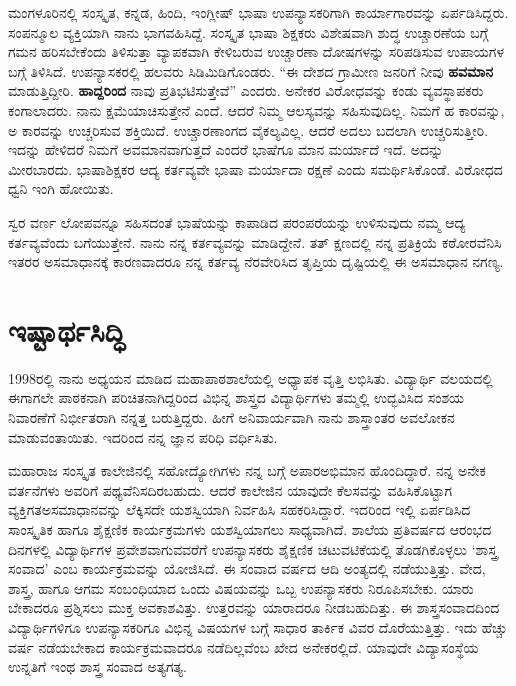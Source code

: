 {ಮಂಗಳೂರಿನಲ್ಲಿ ಸಂಸ್ಕೃತ, ಕನ್ನಡ, ಹಿಂದಿ, ಇಂಗ್ಲೀಷ್ ಭಾಷಾ ಉಪನ್ಯಾಸಕರಿಗಾಗಿ ಕಾರ್ಯಾಗಾರವನ್ನು ಏರ್ಪಡಿಸಿದ್ದರು.  ಸಂಪನ್ಮೂಲ ವ್ಯಕ್ತಿಯಾಗಿ ನಾನು ಭಾಗವಹಿಸಿದ್ದೆ.  ಸಂಸ್ಕೃತ ಭಾಷಾ ಶಿಕ್ಷಕರು ವಿಶೇಷವಾಗಿ ಶುದ್ಧ ಉಚ್ಚಾರಣೆಯ ಬಗ್ಗೆ ಗಮನ ಹರಿಸ\-ಬೇಕೆಂದು ತಿಳಿಸುತ್ತಾ ವ್ಯಾಪಕವಾಗಿ ಕೇಳಿಬರುವ ಉಚ್ಚಾರಣಾ ದೋಷಗಳನ್ನು ಸರಿಪಡಿಸುವ ಉಪಾಯಗಳ ಬಗ್ಗೆ ತಿಳಿಸಿದೆ.  ಉಪನ್ಯಾಸಕರಲ್ಲಿ ಹಲವರು ಸಿಡಿಮಿಡಿಗೊಂಡರು.  “ಈ ದೇಶದ ಗ್ರಾಮೀಣ ಜನರಿಗೆ ನೀವು \textbf{ಹವಮಾನ} ಮಾಡುತ್ತಿದ್ದೀರಿ.  \textbf{ಹಾದ್ದರಿಂದ} ನಾವು ಪ್ರತಿಭಟಿಸುತ್ತೇವೆ” ಎಂದರು.  ಅನೇಕರ ವಿರೋಧವನ್ನು ಕಂಡು ವ್ಯವಸ್ಥಾಪಕರು ಕಂಗಾಲಾದರು. ನಾನು ಕ್ಷಮೆಯಾಚಿಸುತ್ತೇನೆ  ಎಂದೆ.   ಆದರೆ ನಿಮ್ಮ ಆಲಸ್ಯವನ್ನು ಸಹಿಸು\-ವುದಿಲ್ಲ.  ನಿಮಗೆ ಹ ಕಾರವನ್ನು, ಅ ಕಾರವನ್ನು ಉಚ್ಚರಿಸುವ ಶಕ್ತಿಯಿದೆ.  ಉಚ್ಚಾರಣಾಂಗದ ವೈಕಲ್ಯವಿಲ್ಲ.  ಆದರೆ ಅದಲು ಬದಲಾಗಿ ಉಚ್ಚರಿಸುತ್ತೀರಿ.  ಇದನ್ನು ಹೇಳಿದರೆ ನಿಮಗೆ ಅವಮಾನವಾಗುತ್ತದೆ ಎಂದರೆ ಭಾಷೆಗೂ ಮಾನ  \enginline{-}  ಮರ್ಯಾದೆ ಇದೆ.  ಅದನ್ನು ಮೀರಬಾರದು.  ಭಾಷಾಶಿಕ್ಷಕರ ಆದ್ಯ ಕರ್ತವ್ಯವೇ ಭಾಷಾ ಮರ್ಯಾದಾ ರಕ್ಷಣೆ ಎಂದು ಸಮರ್ಥಿಸಿಕೊಂಡೆ.  ವಿರೋಧದ ಧ್ವನಿ ಇಂಗಿ ಹೋಯಿತು. 

ಸ್ವರ ವರ್ಣ ಲೋಪವನ್ನೂ ಸಹಿಸದಂತೆ ಭಾಷೆಯನ್ನು ಕಾಪಾಡಿದ ಪರಂಪರೆಯನ್ನು ಉಳಿಸುವುದು ನಮ್ಮ ಆದ್ಯ ಕರ್ತವ್ಯವೆಂದು ಬಗೆಯುತ್ತೇನೆ.  ನಾನು ನನ್ನ ಕರ್ತವ್ಯವನ್ನು ಮಾಡಿದ್ದೇನೆ.  ತತ್ ಕ್ಷಣದಲ್ಲಿ ನನ್ನ ಪ್ರತಿಕ್ರಿಯೆ ಕಠೋರವೆನಿಸಿ ಇತರರ ಅಸಮಾಧಾನಕ್ಕೆ ಕಾರಣವಾದರೂ ನನ್ನ ಕರ್ತವ್ಯ ನೆರವೇರಿಸಿದ ತೃಪ್ತಿಯ ದೃಷ್ಟಿಯಲ್ಲಿ ಈ ಅಸಮಾಧಾನ ನಗಣ್ಯ.

\section*{ಇಷ್ಟಾರ್ಥಸಿದ್ಧಿ }

1998ರಲ್ಲಿ ನಾನು ಅಧ್ಯಯನ ಮಾಡಿದ ಮಹಾಪಾಠಶಾಲೆಯಲ್ಲಿ ಅಧ್ಯಾಪಕ ವೃತ್ತಿ ಲಭಿಸಿತು.  ವಿದ್ಯಾರ್ಥಿ ವಲಯದಲ್ಲಿ ಈಗಾಗಲೇ ಪಾಠಕನಾಗಿ ಪರಿಚಿತನಾಗಿದ್ದರಿಂದ ವಿಭಿನ್ನ ಶಾಸ್ತ್ರದ ವಿದ್ಯಾರ್ಥಿಗಳು ತಮ್ಮಲ್ಲಿ ಉದ್ಭವಿಸಿದ ಸಂಶಯ ನಿವಾರಣೆಗೆ ನಿರ್ಭೀತರಾಗಿ ನನ್ನತ್ತ ಬರುತ್ತಿದ್ದರು.  ಹೀಗೆ ಅನಿವಾರ್ಯವಾಗಿ ನಾನು ಶಾಸ್ತ್ರಾಂತರ ಅವಲೋಕನ ಮಾಡುವಂತಾಯಿತು.  ಇದರಿಂದ ನನ್ನ ಜ್ಞಾನ ಪರಿಧಿ ವರ್ಧಿಸಿತು.  

ಮಹಾರಾಜ ಸಂಸ್ಕೃತ ಕಾಲೇಜಿನಲ್ಲಿ ಸಹೋದ್ಯೋಗಿಗಳು ನನ್ನ ಬಗ್ಗೆ ಅಪಾರ\break ಅಭಿಮಾನ ಹೊಂದಿದ್ದಾರೆ.  ನನ್ನ ಅನೇಕ ವರ್ತನೆಗಳು ಅವರಿಗೆ ಪಥ್ಯವೆನಿಸದಿರಬಹುದು.   ಆದರೆ ಕಾಲೇಜಿನ ಯಾವುದೇ ಕೆಲಸವನ್ನು ವಹಿಸಿಕೊಟ್ಟಾಗ ವ್ಯಕ್ತಿಗತ\break ಅಸಮಾಧಾನವನ್ನು ಲೆಕ್ಕಿಸದೇ ಯಶಸ್ವಿಯಾಗಿ ನಿರ್ವಹಿಸಿ ಸಹಕರಿಸಿದ್ದಾರೆ.  ಇದರಿಂದ ಇಲ್ಲಿ ಏರ್ಪಡಿ\-ಸಿದ ಸಾಂಸ್ಕೃತಿಕ ಹಾಗೂ ಶೈಕ್ಷಣಿಕ ಕಾರ್ಯಕ್ರಮಗಳು ಯಶಸ್ವಿಯಾಗಲು ಸಾಧ್ಯವಾಗಿದೆ.  ಶಾಲೆಯ ಪ್ರತಿವರ್ಷದ ಆರಂಭದ ದಿನಗಳಲ್ಲಿ ವಿದ್ಯಾರ್ಥಿಗಳ ಪ್ರವೇಶವಾಗುವವರೆಗೆ ಉಪನ್ಯಾಸಕರು ಶೈಕ್ಷಣಿಕ ಚಟುವಟಿಕೆಯಲ್ಲಿ ತೊಡಗಿಕೊಳ್ಳಲು ‘ಶಾಸ್ತ್ರ ಸಂವಾದ’ ಎಂಬ ಕಾರ್ಯಕ್ರಮವನ್ನು ಯೋಜಿಸಿದೆ.  ಈ ಸಂವಾದ ವರ್ಷದ ಆದಿ ಅಂತ್ಯದಲ್ಲಿ ನಡೆಯುತ್ತಿತ್ತು.  ವೇದ, ಶಾಸ್ತ್ರ, ಹಾಗೂ ಆಗಮ ಸಂಬಂಧಿಯಾದ ಒಂದು ವಿಷಯವನ್ನು ಒಬ್ಬ ಉಪನ್ಯಾಸಕರು ನಿರೂಪಿಸಬೇಕು.  ಯಾರು ಬೇಕಾದರೂ ಪ್ರಶ್ನಿಸಲು ಮುಕ್ತ ಅವಕಾಶವಿತ್ತು.  ಉತ್ತರವನ್ನು ಯಾರಾದರೂ ನೀಡಬಹುದಿತ್ತು.  ಈ ಶಾಸ್ತ್ರ\break ಸಂವಾದದಿಂದ ವಿದ್ಯಾರ್ಥಿ\-ಗಳಿಗೂ ಉಪನ್ಯಾಸಕರಿಗೂ ವಿಭಿನ್ನ ವಿಷಯಗಳ ಬಗ್ಗೆ ಸಾಧಾರ ತಾರ್ಕಿಕ ವಿವರ ದೊರೆಯುತ್ತಿತ್ತು.  ಇದು ಹೆಚ್ಚು ವರ್ಷ ನಡೆಯಬೇಕಾದ ಕಾರ್ಯಕ್ರಮವಾದರೂ ನಡೆದಿಲ್ಲವೆಂಬ ಖೇದ ಅನೇಕರಲ್ಲಿದೆ.  ಯಾವುದೇ ವಿದ್ಯಾ\break ಸಂಸ್ಥೆಯ ಉನ್ನತಿಗೆ ಇಂಥ ಶಾಸ್ತ್ರ ಸಂವಾದ ಅತ್ಯಗತ್ಯ.  

}
